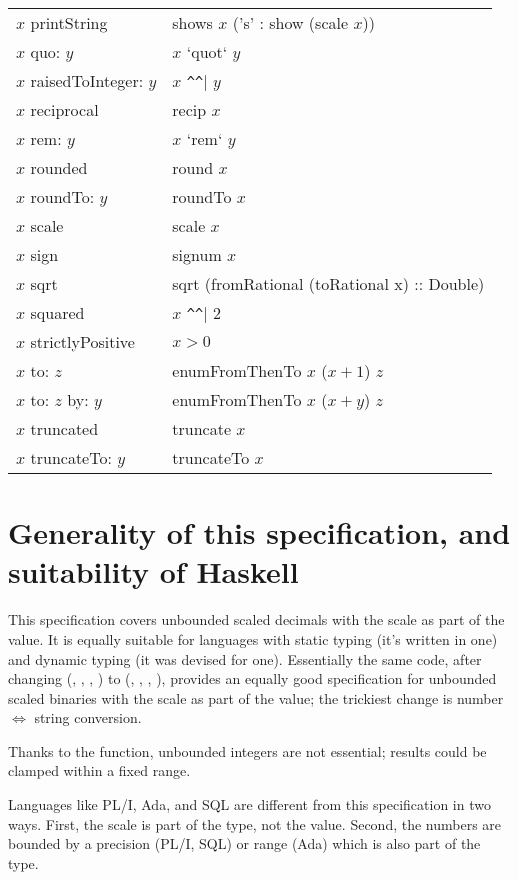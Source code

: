\documentclass[prodmode,acmtoplas]{acmsmall}
\begin{document}
\begin{tabular}{ll}
$x$ printString       & shows $x$ ('s' : show (scale $x$))\\
$x$ quo: $y$          & $x$ `quot` $y$\\
$x$ raisedToInteger: $y$ & $x$ \verb|^^| $y$ \\
$x$ reciprocal        & recip $x$\\
$x$ rem: $y$          & $x$ `rem` $y$\\
$x$ rounded           & round $x$\\
$x$ roundTo: $y$      & roundTo $x$\\
$x$ scale             & scale $x$\\
$x$ sign              & signum $x$\\
$x$ sqrt              & sqrt (fromRational (toRational x) :: Double)\\
$x$ squared           & $x$ \verb|^^| 2\\
$x$ strictlyPositive  & $x > 0$\\
$x$ to: $z$           & enumFromThenTo $x$ ($x+1$) $z$\\
$x$ to: $z$ by: $y$   & enumFromThenTo $x$ ($x+y$) $z$\\
$x$ truncated         & truncate $x$\\
$x$ truncateTo: $y$   & truncateTo $x$
\end{tabular}

\section{Generality of this specification, and suitability of Haskell}

This specification covers unbounded scaled decimals with the scale as
part of the value.  It is equally suitable for languages with static
typing (it's written in one) and dynamic typing (it was devised for
one).  Essentially the same code, after changing (,
, , ) to (, , ,
), provides an equally good specification for unbounded scaled
binaries with the scale as part of the value; the trickiest change is
number $\Leftrightarrow$ string conversion.

Thanks to the  function, unbounded integers are not
essential; results could be clamped within a fixed range.

Languages like PL/I, Ada, and SQL are different from this
specification in two ways.  First,
the scale is part of the type, not the value.  Second, the numbers
are bounded by a precision (PL/I, SQL) or range (Ada) which is also
part of the type.
\end{document}
